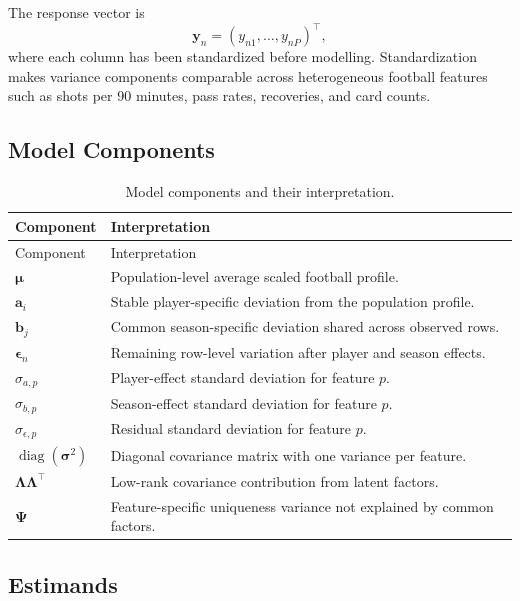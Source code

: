 \documentclass[11pt]{article}
\begin{document}
The response vector is
\begin{equation}
  \mathbf{y}_n = (y_{n1},\ldots,y_{nP})^\top ,
\end{equation}
where each column has been standardized before modelling. Standardization makes
variance components comparable across heterogeneous football features such as
shots per 90 minutes, pass rates, recoveries, and card counts.

\subsection{Model Components}

\begin{longtable}{L{0.22\textwidth}L{0.68\textwidth}}
\caption{Model components and their interpretation.}
\label{tab:model-components}\\
\toprule
Component & Interpretation \\
\midrule
\endfirsthead
\toprule
Component & Interpretation \\
\midrule
\endhead
\bottomrule
\endfoot
\(\boldsymbol{\mu}\) & Population-level average scaled football profile. \\
\(\mathbf{a}_i\) & Stable player-specific deviation from the population profile. \\
\(\mathbf{b}_j\) & Common season-specific deviation shared across observed rows. \\
\(\boldsymbol{\epsilon}_n\) & Remaining row-level variation after player and season effects. \\
\(\sigma_{a,p}\) & Player-effect standard deviation for feature \(p\). \\
\(\sigma_{b,p}\) & Season-effect standard deviation for feature \(p\). \\
\(\sigma_{\epsilon,p}\) & Residual standard deviation for feature \(p\). \\
\(\operatorname{diag}(\boldsymbol{\sigma}^2)\) & Diagonal covariance matrix with one variance per feature. \\
\(\boldsymbol{\Lambda}\boldsymbol{\Lambda}^{\top}\) & Low-rank covariance contribution from latent factors. \\
\(\boldsymbol{\Psi}\) & Feature-specific uniqueness variance not explained by common factors. \\
\end{longtable}

\subsection{Estimands}
\end{document}
